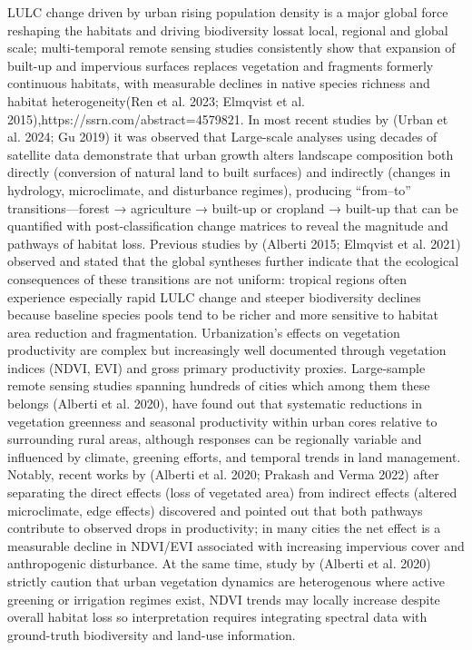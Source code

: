 LULC change driven by urban rising population density is a major global force reshaping the habitats and driving biodiversity lossat local, regional and global scale; multi-temporal remote sensing studies consistently show that expansion of built-up and impervious surfaces replaces vegetation and fragments formerly continuous habitats, with measurable declines in native species richness and habitat heterogeneity(Ren et al. 2023; Elmqvist et al. 2015),https://ssrn.com/abstract=4579821. In most recent studies by (Urban et al. 2024; Gu 2019) it was observed that Large-scale analyses using decades of satellite data demonstrate that urban growth alters landscape composition both directly (conversion of natural land to built surfaces) and indirectly (changes in hydrology, microclimate, and disturbance regimes), producing ``from--to'' transitions---forest → agriculture → built-up or cropland → built-up that can be quantified with post-classification change matrices to reveal the magnitude and pathways of habitat loss. Previous studies by (Alberti 2015; Elmqvist et al. 2021) observed and stated that the global syntheses further indicate that the ecological consequences of these transitions are not uniform: tropical regions often experience especially rapid LULC change and steeper biodiversity declines because baseline species pools tend to be richer and more sensitive to habitat area reduction and fragmentation.
Urbanization's effects on vegetation productivity are complex but increasingly well documented through vegetation indices (NDVI, EVI) and gross primary productivity proxies. Large-sample remote sensing studies spanning hundreds of cities which among them these belongs (Alberti et al. 2020), have found out that systematic reductions in vegetation greenness and seasonal productivity within urban cores relative to surrounding rural areas, although responses can be regionally variable and influenced by climate, greening efforts, and temporal trends in land management. Notably, recent works by (Alberti et al. 2020; Prakash and Verma 2022) after separating the direct effects (loss of vegetated area) from indirect effects (altered microclimate, edge effects) discovered and pointed out that both pathways contribute to observed drops in productivity; in many cities the net effect is a measurable decline in NDVI/EVI associated with increasing impervious cover and anthropogenic disturbance. At the same time, study by (Alberti et al. 2020) strictly caution that urban vegetation dynamics are heterogenous where active greening or irrigation regimes exist, NDVI trends may locally increase despite overall habitat loss so interpretation requires integrating spectral data with ground-truth biodiversity and land-use information.

